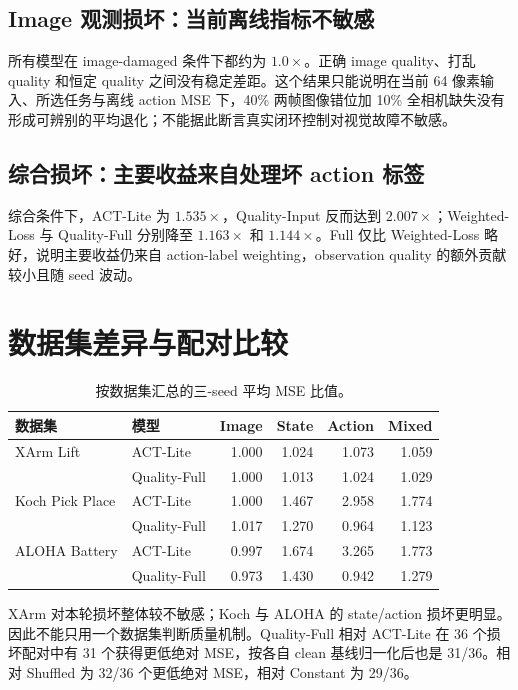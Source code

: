 \documentclass[11pt,a4paper]{ctexart}
\begin{document}
\subsection{Image 观测损坏：当前离线指标不敏感}

所有模型在 image-damaged 条件下都约为 $1.0\times$。正确 image quality、打乱 quality 和恒定 quality 之间没有稳定差距。这个结果只能说明在当前 64 像素输入、所选任务与离线 action MSE 下，40\% 两帧图像错位加 10\% 全相机缺失没有形成可辨别的平均退化；不能据此断言真实闭环控制对视觉故障不敏感。

\subsection{综合损坏：主要收益来自处理坏 action 标签}

综合条件下，ACT-Lite 为 $1.535\times$，Quality-Input 反而达到 $2.007\times$；Weighted-Loss 与 Quality-Full 分别降至 $1.163\times$ 和 $1.144\times$。Full 仅比 Weighted-Loss 略好，说明主要收益仍来自 action-label weighting，observation quality 的额外贡献较小且随 seed 波动。

\section{数据集差异与配对比较}

\begin{table}[H]
\centering
\scriptsize
\begin{tabular}{p{32mm}p{31mm}rrrr}
\toprule
数据集 & 模型 & Image & State & Action & Mixed\\
\midrule
XArm Lift & ACT-Lite & 1.000 & 1.024 & 1.073 & 1.059\\
 & Quality-Full & 1.000 & 1.013 & 1.024 & 1.029\\
Koch Pick Place & ACT-Lite & 1.000 & 1.467 & 2.958 & 1.774\\
 & Quality-Full & 1.017 & 1.270 & 0.964 & 1.123\\
ALOHA Battery & ACT-Lite & 0.997 & 1.674 & 3.265 & 1.773\\
 & Quality-Full & 0.973 & 1.430 & 0.942 & 1.279\\
\bottomrule
\end{tabular}
\caption{按数据集汇总的三-seed 平均 MSE 比值。}
\end{table}

XArm 对本轮损坏整体较不敏感；Koch 与 ALOHA 的 state/action 损坏更明显。因此不能只用一个数据集判断质量机制。Quality-Full 相对 ACT-Lite 在 36 个损坏配对中有 31 个获得更低绝对 MSE，按各自 clean 基线归一化后也是 31/36。相对 Shuffled 为 32/36 个更低绝对 MSE，相对 Constant 为 29/36。
\end{document}
